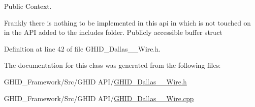 \-Public \-Context. 

\-Frankly there is nothing to be implemented in this api in which is not touched on in the \-A\-P\-I added to the includes folder. \-Publicly accessible buffer struct 

\-Definition at line 42 of file \-G\-H\-I\-D\-\_\-\-Dallas\-\_\-\_\-\-Wire.\-h.



\-The documentation for this class was generated from the following files\-:\begin{DoxyCompactItemize}
\item 
\-G\-H\-I\-D\-\_\-\-Framework/\-Src/\-G\-H\-I\-D A\-P\-I/\hyperlink{_g_h_i_d___dallas__1___wire_8h}{\-G\-H\-I\-D\-\_\-\-Dallas\-\_\-\_\-\-Wire.\-h}\item 
\-G\-H\-I\-D\-\_\-\-Framework/\-Src/\-G\-H\-I\-D A\-P\-I/\hyperlink{_g_h_i_d___dallas__1___wire_8cpp}{\-G\-H\-I\-D\-\_\-\-Dallas\-\_\-\_\-\-Wire.\-cpp}\end{DoxyCompactItemize}
